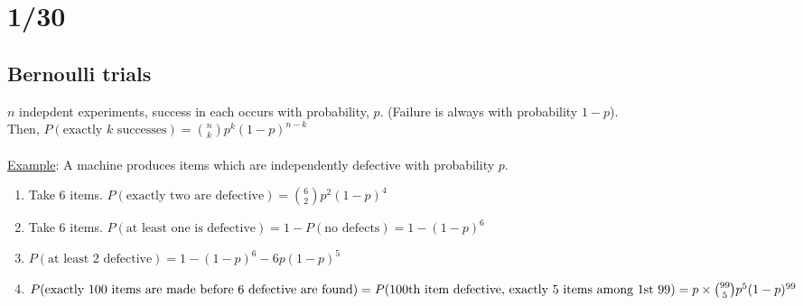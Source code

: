 \section*{1/30}
  \subsection*{Bernoulli trials}
    $n$ indepdent experiments, success in each occurs with probability, $p$. 
    (Failure is always with probability $1-p$).\\
    Then, $P(\text{exactly $k$ successes}) = \binom{n}{k}p^k(1-p)^{n-k}$\\\\
  \underline{Example}: A machine produces items which are independently 
  defective with probability $p$.\\
  \begin{enumerate}
    \item Take 6 items. $P(\text{exactly two are defective}) = \binom{6}{2}
      p^2(1-p)^4$
    \item Take 6 items. $P(\text{at least one is defective}) = 1 - P(\text{
      no defects})  = 1- (1 - p)^6$
    \item $P(\text{at least 2 defective}) = 1 - (1 - p)^6 - 6p(1-p)^5$
    \item $P(\text{exactly 100 items are made before 6 defective are found})\\
      = P(\text{100th item defective, exactly 5 items among 1st 99}) 
      = p \times \binom{99}{5}p^5 (1 - p)^{99}$
  \end{enumerate}

